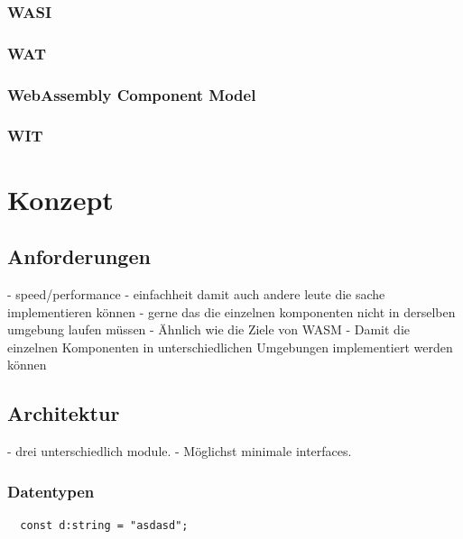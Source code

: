 \documentclass[ngerman]{article}
\begin{document}
\subsubsection{WASI}
\subsubsection{WAT}
\subsubsection{WebAssembly Component Model}
\subsubsection{WIT}

\section{Konzept}
\subsection{Anforderungen}

- speed/performance
- einfachheit damit auch andere leute die sache implementieren können
- gerne das die einzelnen komponenten nicht in derselben umgebung laufen müssen
- Ähnlich wie die Ziele von WASM
- Damit die einzelnen Komponenten in unterschiedlichen Umgebungen implementiert werden können

\subsection{Architektur}

- drei unterschiedlich module. 
- Möglichst minimale interfaces. 

\subsubsection{Datentypen}

\begin{code}
\begin{verbatim}
  const d:string = "asdasd";
\end{verbatim}
\end{code}
\end{document}
